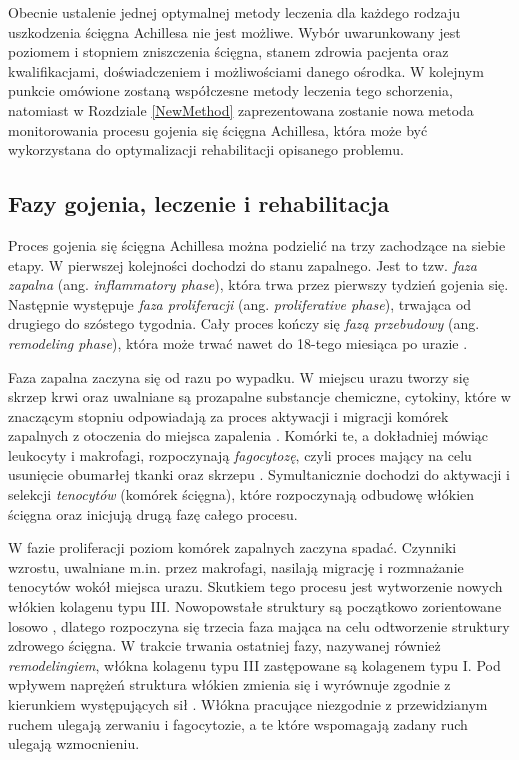 Obecnie ustalenie jednej optymalnej metody leczenia dla każdego rodzaju uszkodzenia ścięgna Achillesa nie jest możliwe. Wybór uwarunkowany jest poziomem \linebreak i stopniem zniszczenia ścięgna, stanem zdrowia pacjenta oraz kwalifikacjami, doświadczeniem i możliwościami danego ośrodka. W kolejnym punkcie omówione zostaną współczesne metody leczenia tego schorzenia, natomiast w Rozdziale \ref{NewMethod} zaprezentowana zostanie nowa metoda monitorowania procesu gojenia się ścięgna Achillesa, która może być wykorzystana do optymalizacji rehabilitacji opisanego problemu. 

\subsection{Fazy gojenia, leczenie i rehabilitacja}
\label{gojenie}

Proces gojenia się ścięgna Achillesa można podzielić na trzy zachodzące na siebie etapy. W pierwszej kolejności dochodzi do stanu zapalnego. Jest to tzw. \textit{faza zapalna} (ang. \textit{inflammatory phase}), która trwa przez pierwszy tydzień gojenia się. Następnie występuje \textit{faza proliferacji} (ang. \textit{proliferative phase}), trwająca od drugiego \linebreak do szóstego tygodnia. Cały proces kończy się \textit{fazą przebudowy} (ang. \textit{remodeling phase}), która może trwać nawet do 18-tego miesiąca po urazie \cite{Sharma2006, Yang2013, Docheva2015, CMC}. 

Faza zapalna zaczyna się od razu po wypadku. W miejscu urazu tworzy się skrzep krwi oraz uwalniane są prozapalne substancje chemiczne, cytokiny, które \linebreak w znaczącym stopniu odpowiadają za proces aktywacji i migracji komórek zapalnych z otoczenia do miejsca zapalenia \cite{Lin2004}. Komórki te, a dokładniej mówiąc leukocyty \linebreak i makrofagi, rozpoczynają \textit{fagocytozę}, czyli proces mający na celu usunięcie obumarłej tkanki oraz skrzepu \cite{Yang2013, Beredjiklian2003, Lin2004}. Symultanicznie dochodzi do aktywacji i selekcji \textit{tenocytów} (komórek ścięgna), które rozpoczynają odbudowę włókien ścięgna \cite{Yang2013} oraz inicjują drugą fazę całego procesu.

W fazie proliferacji poziom komórek zapalnych zaczyna spadać. Czynniki wzrostu, uwalniane m.in. przez makrofagi, nasilają migrację i rozmnażanie tenocytów wokół miejsca urazu. Skutkiem tego procesu jest wytworzenie nowych włókien kolagenu typu III. Nowopowstałe struktury są początkowo zorientowane losowo \cite{Yang2013, Beredjiklian2003, Docheva2015}, dlatego rozpoczyna się trzecia faza mająca na celu odtworzenie struktury zdrowego ścięgna.
\newpage
W trakcie trwania ostatniej fazy, nazywanej również \textit{remodelingiem}, włókna kolagenu typu III zastępowane są kolagenem typu I. Pod wpływem naprężeń struktura włókien zmienia się i wyrównuje zgodnie z kierunkiem występujących sił \cite{Yang2013}. Włókna pracujące niezgodnie z przewidzianym ruchem ulegają zerwaniu i fagocytozie, \linebreak a te które wspomagają zadany ruch ulegają wzmocnieniu. 

